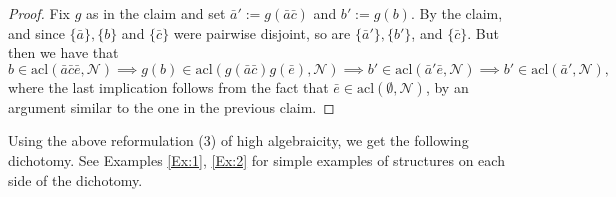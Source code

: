 \documentclass[11pt]{amsart}
\theoremstyle{plain}
\theoremstyle{definition}
\begin{document}
\begin{proof}
Fix $g$ as in the claim and set $\bar{a}':=g(\bar{a}\bar{c})$ and $b':=g(b)$. By the claim, and since $\{\bar{a}\}, \{b\}$  and $\{\bar{c}\}$  were pairwise disjoint, so are $\{\bar{a}'\}, \{b'\}$, and  $\{\bar{c}\}$. But then we have that 
\[b\in\mathrm{acl}(\bar{a}\bar{c}\bar{e},\mathcal{N}) \implies 
g(b)\in\mathrm{acl}(g(\bar{a}\bar{c})g(\bar{e}),\mathcal{N}) \implies 
b'\in\mathrm{acl}(\bar{a}'\bar{e},\mathcal{N})\implies b'\in\mathrm{acl}(\bar{a}',\mathcal{N}), \]
where the last implication follows from the fact that 
$\bar{e}\in \mathrm{acl}(\emptyset,\mathcal{N})$, by an argument similar to the one in the previous claim.
\end{proof}

Using the above reformulation (3) of  high algebraicity, we get the following dichotomy. See Examples \ref{Ex:1}, \ref{Ex:2} for simple examples of structures on each side of the dichotomy.
\end{document}
